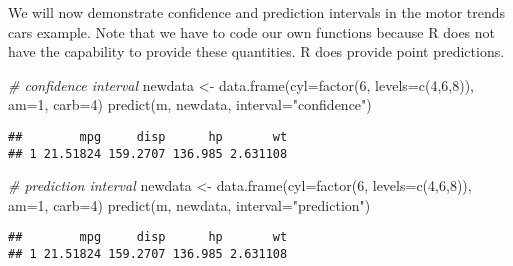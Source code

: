 \documentclass[
  ignorenonframetext,
]{beamer}
\newenvironment{Shaded}{\begin{snugshade}}{\end{snugshade}}
\newcommand{\AttributeTok}[1]{\textcolor[rgb]{0.77,0.63,0.00}{#1}}
\newcommand{\CommentTok}[1]{\textcolor[rgb]{0.56,0.35,0.01}{\textit{#1}}}
\newcommand{\DecValTok}[1]{\textcolor[rgb]{0.00,0.00,0.81}{#1}}
\newcommand{\FunctionTok}[1]{\textcolor[rgb]{0.00,0.00,0.00}{#1}}
\newcommand{\NormalTok}[1]{#1}
\newcommand{\OtherTok}[1]{\textcolor[rgb]{0.56,0.35,0.01}{#1}}
\newcommand{\StringTok}[1]{\textcolor[rgb]{0.31,0.60,0.02}{#1}}
\begin{document}
\begin{frame}[fragile]{}
\protect\hypertarget{section-7}{}
We will now demonstrate confidence and prediction intervals in the motor
trends cars example. Note that we have to code our own functions because
R does not have the capability to provide these quantities. R does
provide point predictions.

\vspace{12pt}
\tiny

\begin{Shaded}
\begin{Highlighting}[]
\CommentTok{\# confidence interval}
\NormalTok{newdata }\OtherTok{\textless{}{-}} \FunctionTok{data.frame}\NormalTok{(}\AttributeTok{cyl=}\FunctionTok{factor}\NormalTok{(}\DecValTok{6}\NormalTok{, }\AttributeTok{levels=}\FunctionTok{c}\NormalTok{(}\DecValTok{4}\NormalTok{,}\DecValTok{6}\NormalTok{,}\DecValTok{8}\NormalTok{)), }\AttributeTok{am=}\DecValTok{1}\NormalTok{, }\AttributeTok{carb=}\DecValTok{4}\NormalTok{)}
\FunctionTok{predict}\NormalTok{(m, newdata, }\AttributeTok{interval=}\StringTok{"confidence"}\NormalTok{)}
\end{Highlighting}
\end{Shaded}

\begin{verbatim}
##        mpg     disp      hp       wt
## 1 21.51824 159.2707 136.985 2.631108
\end{verbatim}

\begin{Shaded}
\begin{Highlighting}[]
\CommentTok{\# prediction interval}
\NormalTok{newdata }\OtherTok{\textless{}{-}} \FunctionTok{data.frame}\NormalTok{(}\AttributeTok{cyl=}\FunctionTok{factor}\NormalTok{(}\DecValTok{6}\NormalTok{, }\AttributeTok{levels=}\FunctionTok{c}\NormalTok{(}\DecValTok{4}\NormalTok{,}\DecValTok{6}\NormalTok{,}\DecValTok{8}\NormalTok{)), }\AttributeTok{am=}\DecValTok{1}\NormalTok{, }\AttributeTok{carb=}\DecValTok{4}\NormalTok{)}
\FunctionTok{predict}\NormalTok{(m, newdata, }\AttributeTok{interval=}\StringTok{"prediction"}\NormalTok{)}
\end{Highlighting}
\end{Shaded}

\begin{verbatim}
##        mpg     disp      hp       wt
## 1 21.51824 159.2707 136.985 2.631108
\end{verbatim}
\end{frame}
\end{document}
